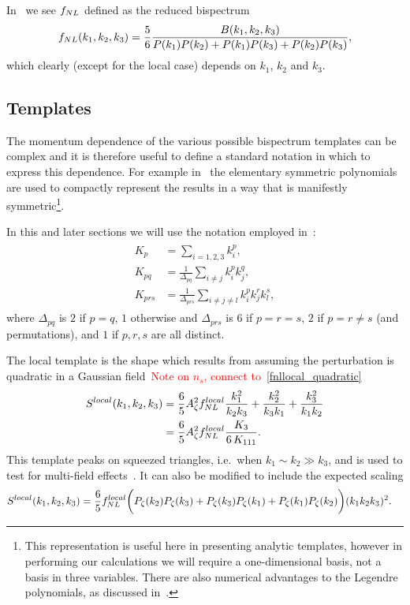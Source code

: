     In~\cite{px_burrage, transport_main} we see $f_{NL}$ defined as the reduced bispectrum
    \begin{align}\label{transport_fnl_defn}
        f_{NL}(k_1,k_2,k_3) = \frac{5}{6}\frac{B(k_1,k_2,k_3)}{P(k_1)P(k_2)+P(k_1)P(k_3)+P(k_2)P(k_3)},
    \end{align}
    which clearly (except for the local case) depends on $k_1$, $k_2$ and $k_3$.


    \subsection{Templates}
    The momentum dependence of the various possible bispectrum templates can be complex
    and it is therefore useful to define a standard notation in which to express this dependence.
    For example in~\cite{Fergusson_2010, Pajer_boostless_2020} the elementary
    symmetric polynomials are used to compactly represent the results in a way that is manifestly
    symmetric\footnote{This representation is useful here in presenting analytic templates, however in performing
    our calculations we will require a one-dimensional basis, not a basis in three variables.
    There are also numerical advantages to the Legendre polynomials, as discussed in~\cite{Fergusson_2010}.}.


In this and later sections we will use the notation employed in~\cite{FergShell_2}:
\begin{align}\label{shape_notation}
\begin{split}
    K_p &= \sum_{i=1,2,3} k_i^p, \\
    K_{pq} &= \frac{1}{\Delta_{pq}}\sum_{i\neq j} k_i^p k_j^q,   \\
    K_{prs} &= \frac{1}{\Delta_{prs}}\sum_{i\neq j\neq l} k_i^p k_j^r k_l^s,
\end{split}
\end{align}
where $\Delta_{pq}$ is $2$ if $p=q$, $1$ otherwise
and $\Delta_{prs}$ is $6$ if $p=r=s$, $2$ if $p=r\neq s$ (and permutations),
and $1$ if $p,r,s$ are all distinct.


    The local template is the shape which results from assuming the perturbation is
    quadratic in a Gaussian field~\textcolor{red}{Note on $n_s$,
    connect to~\eqref{fnllocal_quadratic}
    }
\begin{align}\label{local_shape}
S^{local}(k_1,k_2,k_3)
    &= \frac{6}{5}A_\zeta^2f^{local}_{NL}\frac{k_1^2}{k_2k_3}+\frac{k_2^2}{k_3k_1}+\frac{k_3^2}{k_1k_2}\\
    &= \frac{6}{5}A_\zeta^2f^{local}_{NL}\frac{K_3}{6\,K_{111}}.
\end{align}
This template peaks on squeezed triangles, i.e.\ when $k_1\sim k_2\gg k_3$,
and is used to test for multi-field effects~\cite{Planck_NG_2015}.
It can also be modified to include the expected scaling
\begin{align}
S^{local}(k_1,k_2,k_3)
    &= \frac{6}{5}f^{local}_{NL}\bigg(
        P_\zeta(k_2)P_\zeta(k_3)
        +P_\zeta(k_3)P_\zeta(k_1)
        +P_\zeta(k_1)P_\zeta(k_2)
    \bigg)(k_1k_2k_3)^2.
\end{align}



